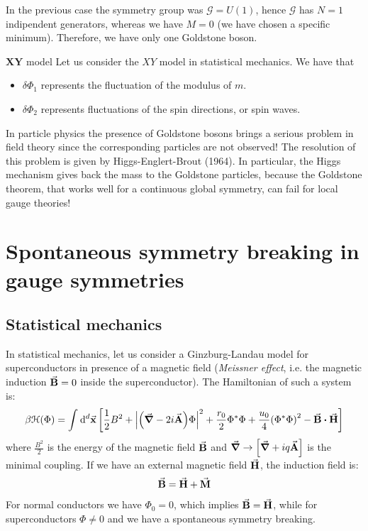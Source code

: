 \documentclass[../../Main/Main.tex]{subfiles}
\begin{document}
In the previous case the symmetry group was \( \mathcal{G} = U (1) \), hence \( \mathcal{G} \) has \( N=1 \) indipendent generators, whereas we have \( M=0 \) (we have chosen a specific minimum). Therefore, we have only one Goldstone boson.


\begin{example}{\(\pmb{XY}\) model}{}
Let us consider the \( XY \) model in statistical mechanics. We have that
\begin{itemize}
\item \( \delta \Phi _1 \) represents the fluctuation of the modulus of \( m \).
\item \( \delta \Phi _2 \) represents fluctuations of the spin directions, or spin waves.
\end{itemize}
\end{example}

\begin{remark}
In particle physics the presence of Goldstone bosons brings a serious problem in field theory since the corresponding particles are not observed! The resolution of this problem is given by Higgs-Englert-Brout (1964). In particular, the Higgs mechanism gives back the mass to the Goldstone particles, because the Goldstone theorem, that works well for a continuous global symmetry, can fail for local gauge theories!
\end{remark}



\section{Spontaneous symmetry breaking in gauge symmetries}

\subsection{Statistical mechanics}

In statistical mechanics, let us consider a Ginzburg-Landau model for superconductors in presence of a magnetic field (\emph{Meissner effect}, i.e. the magnetic induction \( \va{B} = 0 \) inside the superconductor). The Hamiltonian of such a system is:
\begin{equation}
  \beta \mathcal{H} (\Phi ) = \int_{}^{} \dd[d]{\va{x}} \qty[\frac{1}{2}B^2 + \abs{\qty(\va{\grad }- 2 i \va{A})\Phi  }^2 + \frac{r_0}{2} \Phi ^* \Phi
  + \frac{u_0}{4} \qty(\Phi ^* \Phi )^2 - \va{B} \vdot \va{H}]
\end{equation}
where \( \frac{B^2}{2} \) is the energy of the magnetic field \( \va{B} \) and \( \va{\grad } \rightarrow \qty[\va{\grad } + i q \va{A}]  \) is the minimal coupling.
If we have an external magnetic field \( \va{H} \), the induction field is:
\begin{equation*}
  \va{B} = \va{H} + \va{M}
\end{equation*}
For normal conductors we have \( \Phi _0 = 0 \), which implies \( \va{B} = \va{H} \), while for superconductors \( \Phi \neq 0 \) and we have a spontaneous symmetry breaking.
\end{document}
